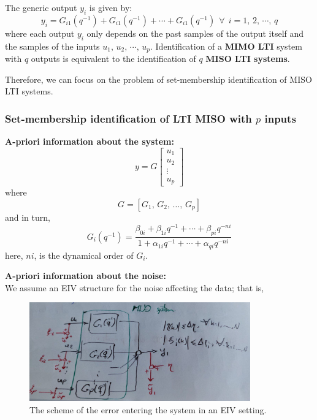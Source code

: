 The generic output $y_i$ is given by:
\[
y_i = G_{i1}(q^{-1}) + G_{i1}(q^{-1}) + \cdots + G_{i1}(q^{-1}) \:\:\forall\:\: i = 1,\,2,\,\cdots,\,q
\]
where each output $y_i$ only depends on the past samples of the output itself and the samples of the inputs $u_1,\,u_2,\,\cdots,\,u_p$. Identification of a \textbf{MIMO LTI} system with $q$ outputs is equivalent to the identification of $q$ \textbf{MISO LTI systems}.

Therefore, we can focus on the problem of set-membership identification of MISO LTI systems.

\subsubsection{Set-membership identification of LTI MISO with $p$ inputs}
\textbf{A-priori information about the system:}
\[
y = G
\begin{bmatrix}
u_1 \\
u_2 \\
\vdots \\
u_p
\end{bmatrix}
\]
where
\[
G = [G_{1},\, G_{2},\,\dots,\, G_{p}]
\]
and in turn,
\[
G_i(q^{-1}) = \frac{\beta_{0i} +\beta_{1i}q^{-1} + \cdots + \beta_{pi}q^{-ni}}{1+\alpha_{1i}q^{-1} + \cdots + \alpha_{qi}q^{-ni}}
\]
here, $ni$, is the dynamical order of $G_i$.

\textbf{A-priori information about the noise:}\\
We assume an EIV structure for the noise affecting the data; that is,

\begin{figure}[htbp]  %
    \centering
    \includegraphics[width=0.85\textwidth]{images/MISO.jpg}
    \caption{The scheme of the error entering the system in an EIV setting.}
    \label{fig:MISO}
\end{figure}

